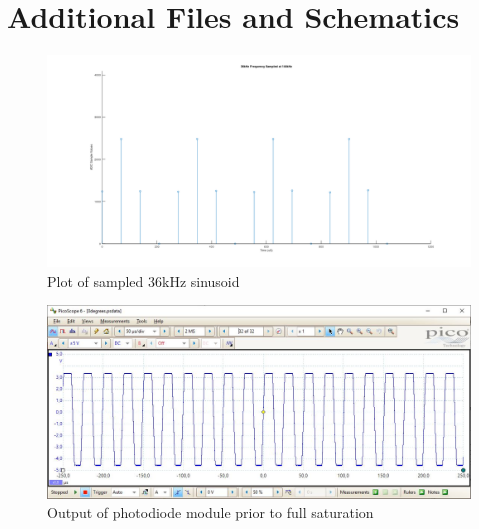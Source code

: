 \chapter{Additional Files and Schematics}
\label{ch_appendixa}






\begin{figure}[H]
	\centering
	\includegraphics[width=\linewidth]{figures/results/36khz_frequency.png}
	\caption{Plot of sampled 36kHz sinusoid}
	\label{fig:sampled_36khz_sinusoid}
\end{figure}

\begin{figure}[H]
	\centering
	\includegraphics[width=\linewidth]{figures/appendix/photodiode_0degrees.JPG}
	\caption{Output of photodiode module prior to full saturation}
	\label{fig:begin_saturation_of_photodiode}
\end{figure}